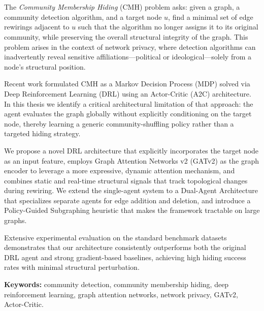 \chapter*{\runtitle}

\noindent
The \emph{Community Membership Hiding} (CMH) problem asks: given a graph, a community
detection algorithm, and a target node $u$, find a minimal set of edge rewirings
adjacent to $u$ such that the algorithm no longer assigns it to its original community,
while preserving the overall structural integrity of the graph.
This problem arises in the context of network privacy, where detection algorithms can
inadvertently reveal sensitive affiliations---political or ideological---solely from
a node's structural position.

Recent work formulated CMH as a Markov Decision Process (MDP) solved via Deep
Reinforcement Learning (DRL) using an Actor-Critic (A2C) architecture.
In this thesis we identify a critical architectural limitation of that approach: the
agent evaluates the graph globally without explicitly conditioning on the target node,
thereby learning a generic community-shuffling policy rather than a targeted hiding
strategy.

We propose a novel DRL architecture that explicitly incorporates the target node as an
input feature, employs Graph Attention Networks v2 (GATv2) as the graph encoder to
leverage a more expressive, dynamic attention mechanism, and combines static and
real-time structural signals that track topological changes during rewiring.
We extend the single-agent system to a Dual-Agent Architecture that specializes separate
agents for edge addition and deletion, and introduce a Policy-Guided Subgraphing
heuristic that makes the framework tractable on large graphs.

Extensive experimental evaluation on the standard benchmark datasets demonstrates that
our architecture consistently outperforms both the original DRL agent and strong
gradient-based baselines, achieving high hiding success rates with minimal structural
perturbation.

\bigskip

\noindent\textbf{Keywords:} community detection, community membership hiding, deep
reinforcement learning, graph attention networks, network privacy, GATv2, Actor-Critic.
